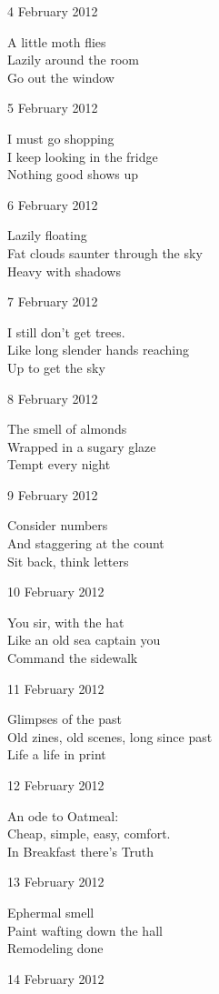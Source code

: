 \documentclass[12pt]{article}
\begin{document}
4 February 2012

A little moth flies \\
Lazily around the room \\
Go out the window

5 February 2012

I must go shopping \\
I keep looking in the fridge \\
Nothing good shows up

6 February 2012

Lazily floating \\
Fat clouds saunter through the sky \\
Heavy with shadows

7 February 2012

I still don't get trees. \\
Like long slender hands reaching \\
Up to get the sky

8 February 2012

The smell of almonds \\
Wrapped in a sugary glaze \\
Tempt every night

\newpage

9 February 2012

Consider numbers \\
And staggering at the count \\
Sit back, think letters

10 February 2012

You sir, with the hat \\
Like an old sea captain you \\
Command the sidewalk

11 February 2012

Glimpses of the past \\
Old zines, old scenes, long since past \\
Life a life in print

12 February 2012

An ode to Oatmeal: \\
Cheap, simple, easy, comfort. \\
In Breakfast there's Truth

13 February 2012

Ephermal smell \\
Paint wafting down the hall \\
Remodeling done

14 February 2012
\end{document}
